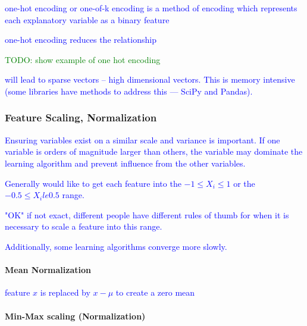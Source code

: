 \textcolor{blue}{{one-hot encoding} or one-of-k encoding is a method of encoding which represents each explanatory variable as a binary feature}

\textcolor{blue}{one-hot encoding reduces the relationship}

\textcolor{green}{TODO: show example of one hot encoding}

\textcolor{blue}{will lead to {sparse vectors} -- high dimensional vectors. This is memory intensive (some libraries have methods to address this --- SciPy and Pandas).}

\subsubsection{Feature Scaling, Normalization}


\textcolor{blue}{Ensuring variables exist on a similar scale and variance is important. If one variable is orders of magnitude larger than others, the variable may dominate the learning algorithm and prevent influence from the other variables.}

\textcolor{blue}{Generally would like to get each feature into the $-1 \le X_i \le 1$ or the $-0.5 \le X_i le 0.5$ range.}

\textcolor{blue}{"OK" if not exact, different people have different rules of thumb for when it is necessary to scale a feature into this range.}

\textcolor{blue}{Additionally, some learning algorithms converge more slowly.}





\paragraph{Mean Normalization}

\textcolor{blue}{feature $x$ is replaced by $x - \mu$ to create a zero mean}


\paragraph{Min-Max scaling (Normalization)}

